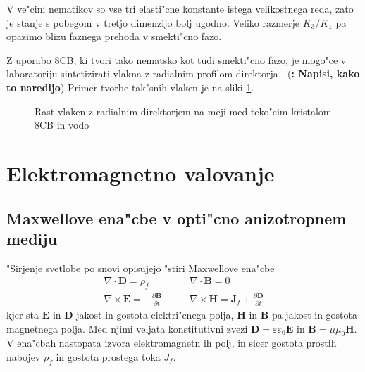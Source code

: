 \documentclass[12pt,twoside,openright,final]{report}
\newcommand{\todo}[1]{(\textbf{\textsmaller{TODO}: #1})}
\newcommand{\odvod}[2]{\frac{\partial #1}{\partial #2}}
\renewcommand{\vec}{\mathbf}
\begin{document}
V ve"cini nematikov so vse tri elasti"cne konstante istega velikostnega reda, zato je stanje s pobegom v tretjo dimenzijo bolj ugodno. 
Veliko razmerje $K_3/K_1$ pa opazimo blizu faznega prehoda v smekti"cno fazo. 

Z uporabo 8CB, ki tvori tako nematsko kot tudi smekti"cno fazo, je mogo"ce v laboratoriju sintetizirati vlakna z radialnim profilom direktorja \cite{peddireddy}. 
\todo{Napisi, kako to naredijo}
Primer tvorbe tak"snih vlaken je na sliki \ref{fig:tvorjenje}. 

\begin{figure}[h]
 \centering
 \caption{Rast vlaken z radialnim direktorjem na meji med teko"cim kristalom 8CB in vodo \cite{peddireddy}}
 \label{fig:tvorjenje}
\end{figure}

\chapter{Elektromagnetno valovanje}

\section{Maxwellove ena"cbe v opti"cno anizotropnem mediju}
"Sirjenje svetlobe po snovi opisujejo "stiri Maxwellove ena"cbe \cite{taflove}
\begin{equation}
\begin{aligned}
 \nabla \cdot \vec D = \rho_f & \qquad \nabla \cdot \vec B = 0 \\
 \nabla \times \vec E = -\odvod{\vec B}{t} & \qquad \nabla \times \vec H = \vec J_f + \odvod{\vec D}{t}
\end{aligned} 
\end{equation}
kjer sta $\vec E$ in $\vec D$ jakost in gostota elektri"cnega polja, $\vec H$ in $\vec B$ pa jakost in gostota magnetnega polja. 
Med njimi veljata konstitutivni zvezi $\vec D = \varepsilon \varepsilon_0 \vec E$ in $\vec B = \mu \mu_0 \vec H$. 
V ena"cbah nastopata izvora elektromagnetn	ih polj, in sicer gostota prostih nabojev $\rho_f$ in gostota prostega toka $J_f$. 
\end{document}
